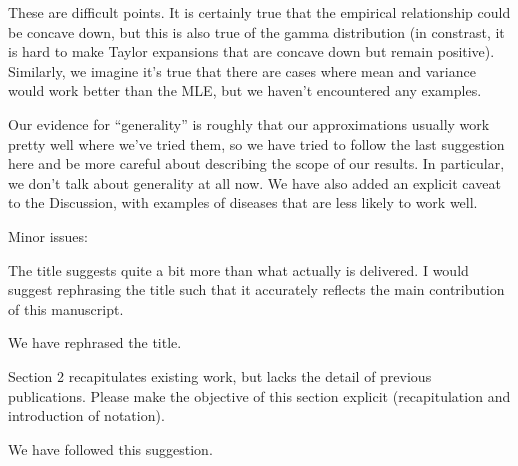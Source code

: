 \documentclass[12pt]{article}
\newcommand{\revtext}{\textsf}
\begin{document}
These are difficult points. It is certainly true that the empirical relationship could be concave down, but this is also true of the gamma distribution (in constrast, it is hard to make Taylor expansions that are concave down but remain positive). Similarly, we imagine it's true that there are cases where mean and variance would work better than the MLE, but we haven't encountered any examples.

Our evidence for ``generality'' is roughly that our approximations usually work pretty well where we've tried them, so we have tried to follow the last suggestion here and be more careful about describing the scope of our results. In particular, we don't talk about generality at all now. We have also added an explicit caveat to the Discussion, with examples of diseases that are less likely to work well.

\revtext{Minor issues:}

\revtext{The title suggests quite a bit more than what actually is delivered. I would suggest rephrasing the title such that it accurately reflects the main contribution of this manuscript.}

We have rephrased the title.

\revtext{Section 2 recapitulates existing work, but lacks the detail of previous publications. Please make the objective of this section explicit (recapitulation and introduction of notation).}

We have followed this suggestion.
\end{document}
